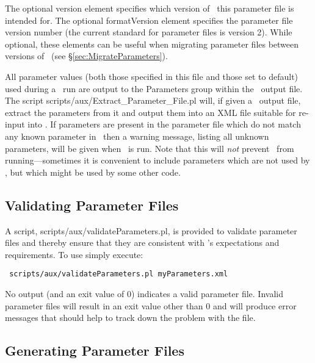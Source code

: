 The optional {\normalfont \ttfamily version} element specifies which version of \glc\ this parameter file is intended for. The optional {\normalfont \ttfamily formatVersion} element specifies the parameter file version number (the current standard for parameter files is version 2). While optional, these elements can be useful when migrating parameter files between versions of \glc\ (see \S\ref{sec:MigrateParameters}).

All parameter values (both those specified in this file and those set to default) used during a \glc\ run are output to the {\normalfont \ttfamily Parameters} group within the \glc\ output file. The script {\normalfont \ttfamily scripts/aux/Extract\_Parameter\_File.pl} will, if given a \glc\ output file, extract the parameters from it and output them into an XML file suitable for re-input into \glc. If parameters are present in the parameter file which do not match any known parameter in \glc\ then a warning message, listing all unknown parameters, will be given when \glc\ is run. Note that this will \emph{not} prevent \glc\ from running---sometimes it is convenient to include parameters which are not used by \glc, but which might be used by some other code.

\subsection{Validating Parameter Files}

A script, {\normalfont \ttfamily scripts/aux/validateParameters.pl}, is provided to validate parameter files and thereby ensure that they are consistent with \glc's expectations and requirements. To use simply execute:
\begin{verbatim}
 scripts/aux/validateParameters.pl myParameters.xml
\end{verbatim}
No output (and an exit value of 0) indicates a valid parameter file. Invalid parameter files will result in an exit value other than 0 and will produce error messages that should help to track down the problem with the file.

\subsection{Generating Parameter Files}

